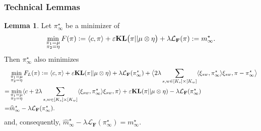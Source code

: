 \documentclass{article}
\newcommand{\kl}{\mathbf{KL}}
\theoremstyle{definition}
\newtheorem{lemma}[theorem]{Lemma}
\begin{document}
\subsubsection{Technical Lemmas}\label{sec:techStuff}
\begin{lemma}\label{lemma:transport-entropic-linearized}
    Let $\pi^\star_\infty$ be a minimizer of
\begin{equation}\label{eq:transport-entropic-penalized}
\min_{\substack{\pi_1= \mu\\
    \pi_2= \eta}} F(\pi) \vcentcolon= \langle c,\pi\rangle +\varepsilon\kl\big(\pi|| \mu\otimes  \eta\big)+ \lambda \mathcal{L}_\mathbf{F}(\pi) : = m_\infty^\star.
\end{equation}
Then $\pi^\star_\infty$ also minimizes 
\begin{align}\label{eq:transport-entropic-linearized}
    & \min_{\substack{\pi_1=\mu\\
    \pi_2=\eta}} F_L(\pi) \vcentcolon= \langle c, \pi\rangle+\varepsilon \kl(\pi||\mu\otimes \eta)+ \lambda \mathcal{L}_\mathbf{F}(\pi^\star_\infty)+\big\langle 2\lambda\sum_{s,w\in [K_s] \times [K_w]}\langle \xi_{sw},\pi^\star_\infty\rangle \xi_{sw},\pi-\pi^\star_\infty\big\rangle \\
    = & \min_{\substack{\pi_1=\mu\\ \nonumber
    \pi_2=\eta}} \langle c+2\lambda\sum_{s,w\in [K_s] \times [K_w]} \langle\xi_{sw},\pi_\infty^\star\rangle \xi_{sw}, \pi\rangle+\varepsilon \kl(\pi||\mu\otimes \eta)- \lambda \mathcal{L}_\mathbf{F}(\pi_\infty^\star)\\ 
    = & \widehat{m}_\infty^\star  - \lambda \mathcal{L}_\mathbf{F}(\pi^\star_\infty). \nonumber
\end{align}
and, consequently,
$
    \widehat{m}_\infty^\star  - \lambda \mathcal{L}_\mathbf{F}(\pi^\star_\infty)  = m_\infty^\star.
$
\end{lemma}
\end{document}
